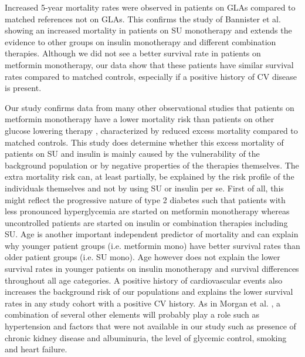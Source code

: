 Increased 5-year mortality rates were observed in patients on GLAs compared to matched references not on GLAs. This confirms the study of Bannister et al. \citep{s9} showing an increased mortality in patients on SU monotherapy and extends the evidence to other groups on insulin monotherapy and different combination therapies. Although we did not see a better survival rate in patients on metformin monotherapy, our data show that these patients have similar survival rates compared to matched controls, especially if a positive history of CV disease is present. 

Our study confirms data from many other observational studies that patients on metformin monotherapy have a lower mortality risk than patients on other glucose lowering therapy \citep{s3,s4,s5,s6,s7,s8}, characterized by reduced excess mortality compared to matched controls. This study does determine whether this excess mortality of patients on SU and insulin is mainly caused by the vulnerability of the background population or by negative properties of the therapies themselves. The extra mortality risk can, at least partially, be explained by the risk profile of the individuals themselves and not by using SU or insulin per se. First of all, this might reflect the progressive nature of type 2 diabetes such that patients with less pronounced hyperglycemia are started on metformin monotherapy whereas uncontrolled patients are started on insulin or combination therapies including SU. Age is another important independent predictor of mortality and can explain why younger patient groups (i.e. metformin mono) have better survival rates than older patient groups (i.e. SU mono). Age however does not explain the lower survival rates in younger patients on insulin monotherapy and survival differences throughout all age categories. A positive history of cardiovascular events also increases the background risk of our populations and explains the lower survival rates in any study cohort with a positive CV history.  As in Morgan et al. \citep{s7}, a combination of several other elements will probably play a role such as hypertension and factors that were not available in our study such as presence of chronic kidney disease and albuminuria, the level of glycemic control, smoking and heart failure.


